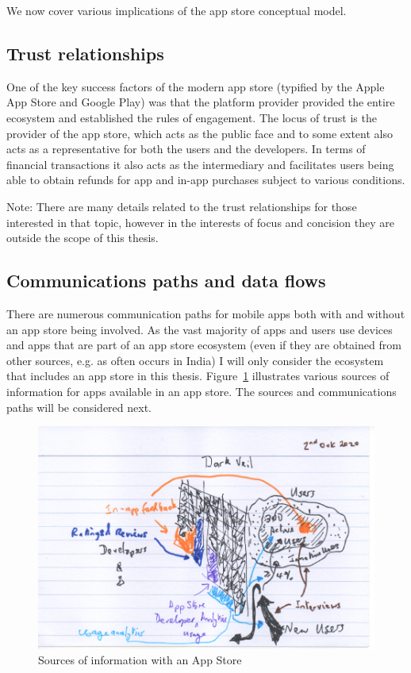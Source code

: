 We now cover various implications of the app store conceptual model.

\subsection{Trust relationships}
One of the key success factors of the modern app store (typified by the Apple App Store and Google Play) was that the platform provider provided the entire ecosystem and established the rules of engagement. The locus of trust is the provider of the app store, which acts as the public face and to some extent also acts as a representative for both the users and the developers. In terms of financial transactions it also acts as the intermediary and facilitates users being able to obtain refunds for app and in-app purchases subject to various conditions. 

Note: There are many details related to the trust relationships for those interested in that topic, however in the interests of focus and concision they are outside the scope of this thesis. 

\subsection{Communications paths and data flows}
There are numerous communication paths for mobile apps both with and without an app store being involved. As the vast majority of apps and users use devices and apps that are part of an app store ecosystem (even if they are obtained from other sources, e.g. as often occurs in India) I will only consider the ecosystem that includes an app store in this thesis. Figure~\ref{fig:sources-of-info-with-app-store-background-ch} illustrates various sources of information for apps available in an app store. The sources and communications paths will be considered next. 

\begin{figure}
    \includegraphics[width=\linewidth]{images/rough-sketches/sources-of-information-with-app-store-1.pdf}
    \caption{Sources of information with an App Store}
    \label{fig:sources-of-info-with-app-store-background-ch}
\end{figure}

